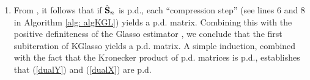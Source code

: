\begin{IEEEproof}
\begin{enumerate}
	\item From \cite{EstCovMatKron}, it follows that if $\hat{{\mathbf{S}}}_n$ is p.d., each ``compression step'' (see lines 6 and 8 in Algorithm \ref{alg: algKGL}) yields a p.d. matrix. Combining this with the positive definiteness of the Glasso estimator \cite{ModelSel}, we conclude that the first subiteration of KGlasso yields a p.d. matrix. A simple induction, combined with the fact that the Kronecker product of p.d. matrices is p.d., establishes that (\ref{dualY}) and (\ref{dualX}) are p.d.

\end{enumerate}
	
	
	
\end{IEEEproof}
